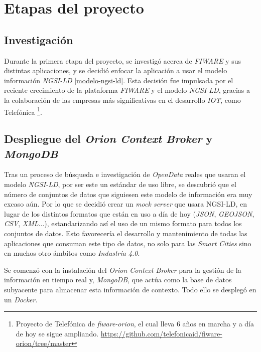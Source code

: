 
\section{Etapas del proyecto}\label{etapas-del-proyecto}

\subsection{Investigación}
Durante la primera etapa del proyecto, se investigó acerca de \textit{FIWARE} y sus distintas aplicaciones, y se decidió enfocar la aplicación a usar el modelo información \textit{NGSI-LD} \ref{modelo-ngsi-ld}. 
Esta decisión fue impulsada por el reciente crecimiento de la plataforma \textit{FIWARE} y el modelo \textit{NGSI-LD}, gracias a la colaboración de las empresas más significativas en el desarrollo \textit{IOT}, como Telefónica \footnote{Proyecto de Telefónica de \textit{fiware-orion}, el cual lleva 6 años en marcha y a día de hoy se sigue ampliando. \url{https://github.com/telefonicaid/fiware-orion/tree/master}}.


\subsection{Despliegue del \textit{Orion Context Broker} y \textit{MongoDB}}

Tras un proceso de búsqueda e investigación de \textit{OpenData} reales que usaran el modelo \textit{NGSI-LD}, por ser este un estándar de uso libre, se descubrió que el número de conjuntos de datos que siguiesen este modelo de información era muy excaso aún. Por lo que se decidió crear un \textit{mock server} que usara NGSI-LD, en lugar de los distintos formatos que están en uso a día de hoy (\textit{JSON}, \textit{GEOJSON}, \textit{CSV}, \textit{XML}...), estandarizando así el uso de un mismo formato para todos los conjuntos de datos. Esto favorecería el desarrollo y mantenimiento de todas las aplicaciones que consuman este tipo de datos, no solo para las \textit{Smart Cities} sino en muchos otro ámbitos como \textit{Industria 4.0}.

Se comenzó con la instalación del \textit{Orion Context Broker} para la gestión de la información en tiempo real y, \textit{MongoDB}, que actúa como la base de datos subyacente para almacenar esta información de contexto. Todo ello se desplegó en un \textit{Docker}.

